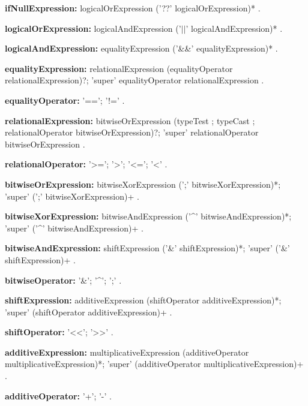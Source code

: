 \begin{grammar}
{\bf ifNullExpression:}
    logicalOrExpression ('??' logicalOrExpression)*
    .
\end{grammar}
\begin{grammar}
{\bf logicalOrExpression:}
    logicalAndExpression ('$||$' logicalAndExpression)*
    .

{\bf logicalAndExpression:}
    equalityExpression ('\&\&' equalityExpression)*
    .
 \end{grammar}
\begin{grammar}
{\bf equalityExpression:}
    relationalExpression (equalityOperator relationalExpression)?;
    'super' equalityOperator relationalExpression
    .

{\bf equalityOperator:}
    '==';
    '!='
    .
\end{grammar}
\begin{grammar}
{\bf relationalExpression:}
    bitwiseOrExpression (typeTest ; typeCast ;  relationalOperator bitwiseOrExpression)?;
    'super' relationalOperator bitwiseOrExpression
    .

{\bf relationalOperator:}
    '>=';
    '>';
    '<=';
    '<'
    .
\end{grammar}
\begin{grammar}
{\bf bitwiseOrExpression:}
    bitwiseXorExpression (';' bitwiseXorExpression)*;
    'super' (';' bitwiseXorExpression)+
    .

{\bf bitwiseXorExpression:}
    bitwiseAndExpression ('\^{}' bitwiseAndExpression)*;
    'super' ('\^{}' bitwiseAndExpression)+
    .

{\bf bitwiseAndExpression:}
    shiftExpression ('\&' shiftExpression)*;
    'super' ('\&' shiftExpression)+
    .

{\bf bitwiseOperator:}
    '&';
    '^';
    ';'
    .
\end{grammar}
\begin{grammar}
{\bf shiftExpression:}
    additiveExpression (shiftOperator additiveExpression)*;
    'super' (shiftOperator additiveExpression)+
    .

{\bf shiftOperator:}
    '<<';
    '>>' 
    .
\end{grammar}
\begin{grammar}
{\bf additiveExpression:}
    multiplicativeExpression (additiveOperator multiplicativeExpression)*;
    'super' (additiveOperator multiplicativeExpression)+
    .

{\bf additiveOperator:}
    '+';
    '-'
    .
\end{grammar}
